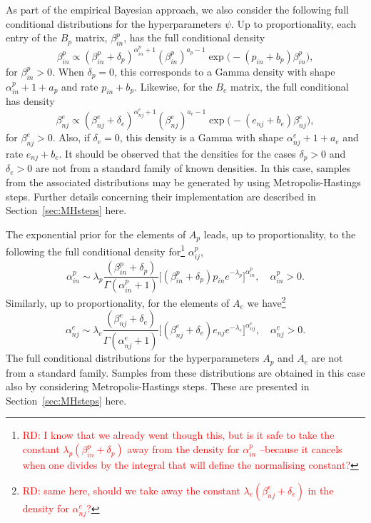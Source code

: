 \documentclass[11pt]{amsart}
\theoremstyle{definition}
\theoremstyle{remark}
\begin{document}
As part of the  empirical Bayesian approach, we also consider the
following full conditional distributions for the hyperparameters
$\psi$. Up to proportionality, each entry of the $B_p$ matrix,
$\beta_{in}^p$,  has the full conditional density
\begin{equation}
 \label{eqn:Full_for_Bp}
 \beta_{in}^p
   \propto
      (\beta_{in}^p + \delta_p)^{\alpha_{in}^p + 1}(\beta_{in}^p)^{a_p
      - 1} \exp\Big(-(p_{in}+b_p)\beta_{in}^p\Big),\tag{$s_4$}
\end{equation}
for $\beta_{in}^p > 0$. When $\delta_p = 0$, this  corresponds  to a
Gamma density with shape $\alpha_{in}^p + 1 + a_p$ and rate $p_{in} +
b_p$.  Likewise, for the $B_e$ matrix, the full conditional has density
\begin{equation}
 \label{eqn:Full_for_Be}
 \beta_{nj}^e
   \propto
      (\beta_{nj}^e + \delta_e)^{\alpha_{nj}^e + 1}(\beta_{nj}^e)^{a_e
      - 1} \exp\Big(-(e_{nj}+b_e)\beta_{nj}^e\Big),\tag{$s_5$}
\end{equation}
for $\beta_{nj}^e > 0$. Also, if $\delta_e = 0$, this density is a
Gamma with shape $\alpha_{nj}^e + 1+ a_e$ and rate $e_{nj}+b_e$. It
should be observed that the densities for the cases $\delta_p > 0$ and
$\delta_e > 0$ are not from a standard family of known densities. In
this case, samples from the associated distributions may be generated
by using Metropolis-Hastings steps. Further details concerning their
implementation are described in Section~\ref{sec:MHsteps} here.



The exponential prior for the elements of $A_p$ leads, up to
proportionality, to the following the full conditional density
for\footnote{\textcolor{red}{RD: I know that we already went though
    this, but  is it safe to take the constant $\lambda_p(\beta_{in}^p
    + \delta_p)$ away from the density for $\alpha_{in}^p$ --because
    it  cancels when one divides by the integral that will define the  normalising constant?}}  
$\alpha_{ij}^p$,
\begin{equation}
 \label{eqn:Full_for_Ap}
  \alpha_{in}^p 
  \sim 
  \lambda_p\frac{(\beta_{in}^p + \delta_p)}{\Gamma(\alpha_{in}^p + 1)} 
   \Big[(\beta_{in}^p + \delta_p)p_{in}
   e^{-\lambda_p}\Big]^{\alpha_{in}^p}, \tag{$s_6$}
   \quad  \alpha_{in}^p > 0.
\end{equation}
Similarly, up to proportionality, for the elements of $A_e$ we
have\footnote{\textcolor{red}{RD: same here, should we take away the constant
  $\lambda_e(\beta_{nj}^e + \delta_e)$ in the density for
  $\alpha_{nj}^e$?}}
\begin{equation}
 \label{eqn:Full_for_Ae}
  \alpha_{nj}^e 
  \sim
  \lambda_e\frac{(\beta_{nj}^e + \delta_e)}{\Gamma(\alpha_{nj}^e + 1)} 
   \Big[(\beta_{nj}^e + \delta_e)e_{nj}
   e^{-\lambda_e}\Big]^{\alpha_{nj}^e}, 
   \quad  \alpha_{nj}^e > 0. \tag{$s_7$}
\end{equation}
The full conditional distributions for the hyperparameters $A_p$ and
$A_e$ are not from a standard family. Samples from these distributions
are obtained in this case also  by considering Metropolis-Hastings
steps. These are presented in Section~\ref{sec:MHsteps} here.
\end{document}
